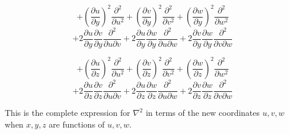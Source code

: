 \documentclass[a4paper, 12pt]{article}
\begin{document}
\[ + \left(\frac{\partial u}{\partial y}\right)^2\frac{\partial^2}{\partial u^2} + \left(\frac{\partial v}{\partial y}\right)^2\frac{\partial^2}{\partial v^2} + \left(\frac{\partial w}{\partial y}\right)^2\frac{\partial^2}{\partial w^2} \]
\[ + 2\frac{\partial u}{\partial y}\frac{\partial v}{\partial y}\frac{\partial^2}{\partial u\partial v} + 2\frac{\partial u}{\partial y}\frac{\partial w}{\partial y}\frac{\partial^2}{\partial u\partial w} + 2\frac{\partial v}{\partial y}\frac{\partial w}{\partial y}\frac{\partial^2}{\partial v\partial w} \]

\[ + \left(\frac{\partial u}{\partial z}\right)^2\frac{\partial^2}{\partial u^2} + \left(\frac{\partial v}{\partial z}\right)^2\frac{\partial^2}{\partial v^2} + \left(\frac{\partial w}{\partial z}\right)^2\frac{\partial^2}{\partial w^2} \]
\[ + 2\frac{\partial u}{\partial z}\frac{\partial v}{\partial z}\frac{\partial^2}{\partial u\partial v} + 2\frac{\partial u}{\partial z}\frac{\partial w}{\partial z}\frac{\partial^2}{\partial u\partial w} + 2\frac{\partial v}{\partial z}\frac{\partial w}{\partial z}\frac{\partial^2}{\partial v\partial w} \]

This is the complete expression for \( \nabla^2 \) in terms of the new coordinates \( u, v, w \) when \( x, y, z \) are functions of \( u, v, w \).






%
%
\end{document}

